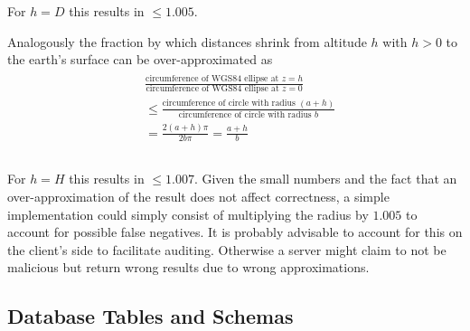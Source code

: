 \documentclass[10pt,conference,compsocconf]{IEEEtran}
\begin{document}
For $h = D$ this results in $\leq 1.005$.

Analogously the fraction by which distances shrink from altitude $h$ with $h > 0$ to the earth's surface can be over-approximated as
\begin{align}
\begin{split}
	&\frac{\text{circumference of WGS84 ellipse at }z=h}{\text{circumference of WGS84 ellipse at }z=0}\\
	&\leq \frac{\text{circumference of circle with radius } (a+h)}{\text{circumference of circle with radius } b}\\
	&= \frac{2 (a+h) \pi}{2 b \pi} = \frac{a+h}{b}\\
	&\\
\end{split}
\end{align}

For $h = H$ this results in $\leq 1.007$.
Given the small numbers and the fact that an over-approximation of the result does not affect correctness, a simple implementation could simply consist of multiplying the radius by $1.005$ to account for possible false negatives.
It is probably advisable to account for this on the client's side to facilitate auditing.
Otherwise a server might claim to not be malicious but return wrong results due to wrong approximations.

\subsection{Database Tables and Schemas}
\label{sec:implementation:schemas}
\end{document}
